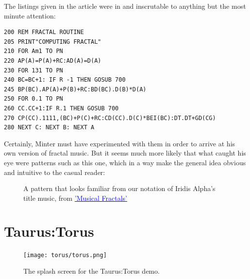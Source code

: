 The listings given in the article were in  and inscrutable to anything but the most minute attention:
\begin{lstlisting}[escapechar=\%,caption=A snippet from \icode{VARIATN.BAS}\, a progam for determinate fractal and Brownian variation.]
200 REM FRACTAL ROUTINE 
205 PRINT"COMPUTING FRACTAL" 
210 FOR Am1 TO PN 
220 AP(A)=P(A)+RC:AD(A)=D(A) 
230 FOR 131 TO PN 
240 BC=BC+1: IF R -1 THEN GOSUB 700 
245 BP(BC).AP(A)+P(B)+RC:BD(BC).D(B)*D(A) 
250 FOR 0.1 TO PN 
260 CC.CC+1:IF R.1 THEN GOSUB 700 
270 CP(CC).1111,(BC)+P(C)+RC:CD(CC).D(C)*BEI(BC):DT.DT+GD(CG) 
280 NEXT C: NEXT B: NEXT A 
\end{lstlisting}


Certainly, Minter must have experimented with them in order to arrive at his own version of fractal music. But it seems much more likely
that what caught his eye were patterns such as this one, which in a way make the general idea obvious and intuitive to the casual
reader:
\begin{figure}[H]
  {
    \begin{adjustbox}{width=12cm,center}
    \end{adjustbox}
  }\caption[]{A pattern that looks familiar from our notation of Iridis Alpha's title music, from \href{https://archive.org/details/byte-magazine-1986-06/page/n191/mode/2up}{\textcolor{blue}{'Musical Fractals'}}}
\end{figure}

\section{Taurus:Torus}
\begin{figure}[H]
{
  \begin{adjustbox}{width=11cm,center}
  \texttt{[image: torus/torus.png]}%
    \end{adjustbox}
}\caption[]{The splash screen for the Taurus:Torus demo.}
\end{figure}

